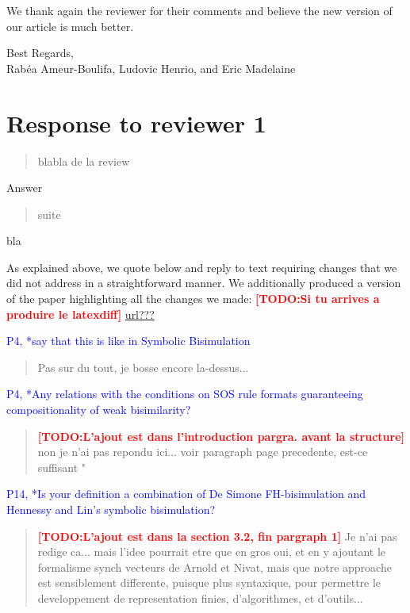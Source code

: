 \documentclass[10pt]{article}
\newenvironment{review}{\bgroup\itshape\begin{quote}}{\end{quote}\egroup}
\newcommand{\TODO}[1]{\textcolor{red}{\textbf{[TODO:#1]}}}
\newcommand{\ERIC}[1]{\textcolor{blue}{#1}}
\begin{document}
We thank again the reviewer for their comments and believe the new version of our article  is much better.

\begin{flushright}
  Best Regards,\\
  Rab\'ea Ameur-Boulifa, Ludovic Henrio, and Eric Madelaine
\end{flushright}

\newpage

\section*{Response to reviewer 1}

\begin{review}
blabla de la review
\end{review}
Answer

\begin{review}
suite
\end{review}
bla






As explained above, we quote below and reply to text requiring changes that we did not  address in a straightforward manner. We additionally produced a version of the paper highlighting all the changes we made: \TODO{Si tu arrives a produire le latexdiff} \url{url???}

\ERIC{P4, *say that this is like in Symbolic Bisimulation}
\begin{quote}Pas sur du tout, je bosse encore la-dessus...
\end{quote}

\ERIC{P4, *Any relations with the conditions on SOS rule formats guaranteeing compositionality of weak bisimilarity?}
\begin{quote} 
\TODO{L'ajout est dans l'introduction pargra. avant la structure}
non je n'ai pas repondu ici... voir paragraph page precedente, est-ce suffisant "
\end{quote}

\ERIC{P14, *Is your definition a combination of De Simone FH-bisimulation and Hennessy and Lin's symbolic bisimulation?}
\begin{quote}
\TODO{L'ajout est dans la section 3.2, fin pargraph 1}
Je n'ai pas redige ca... mais l'idee pourrait etre que en gros oui, et en y ajoutant le formalisme synch vecteurs de Arnold et Nivat, 
mais que notre approache est sensiblement differente, puisque plus syntaxique, pour permettre le developpement de representation finies, d'algorithmes, et d'outils...
\end{quote}
\end{document}
